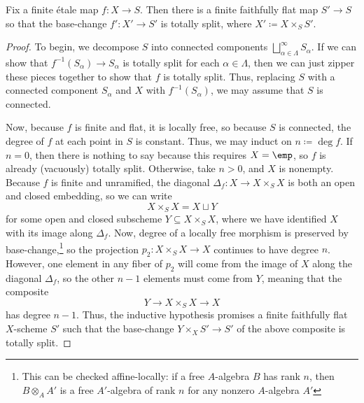 \documentclass{amsart}
\begin{document}
\begin{proposition} \label{prop:finite-etale-is-locally-trivial}
    Fix a finite \'etale map $f\colon X\to S$. Then there is a finite faithfully flat map $S'\to S$ so that the base-change $f'\colon X'\to S'$ is totally split, where $X'\coloneqq X\times_SS'$.
\end{proposition}
\begin{proof}
    To begin, we decompose $S$ into connected components $\bigsqcup_{\alpha\in\Lambda}^\infty S_\alpha$. If we can show that $f^{-1}(S_\alpha)\to S_\alpha$ is totally split for each $\alpha\in\Lambda$, then we can just zipper these pieces together to show that $f$ is totally split. Thus, replacing $S$ with a connected component $S_\alpha$ and $X$ with $f^{-1}(S_\alpha)$, we may assume that $S$ is connected.

    Now, because $f$ is finite and flat, it is locally free, so because $S$ is connected, the degree of $f$ at each point in $S$ is constant. Thus, we may induct on $n\coloneqq\deg f$. If $n=0$, then there is nothing to say because this requires $X=\emp$, so $f$ is already (vacuously) totally split. Otherwise, take $n>0$, and $X$ is nonempty. Because $f$ is finite and unramified, the diagonal $\Delta_f\colon X\to X\times_SX$ is both an open and closed embedding, so we can write
    \[X\times_SX=X\sqcup Y\]
    for some open and closed subscheme $Y\subseteq X\times_SX$, where we have identified $X$ with its image along $\Delta_f$. Now, degree of a locally free morphism is preserved by base-change,\footnote{This can be checked affine-locally: if a free $A$-algebra $B$ has rank $n$, then $B\otimes_AA'$ is a free $A'$-algebra of rank $n$ for any nonzero $A$-algebra $A'$} so the projection $p_2\colon X\times_SX\to X$ continues to have degree $n$. However, one element in any fiber of $p_2$ will come from the image of $X$ along the diagonal $\Delta_f$, so the other $n-1$ elements must come from $Y$, meaning that the composite
    \[Y\to X\times_SX\to X\]
    has degree $n-1$. Thus, the inductive hypothesis promises a finite faithfully flat $X$-scheme $S'$ such that the base-change $Y\times_XS'\to S'$ of the above composite is totally split.
    

\end{proof}
\end{document}
